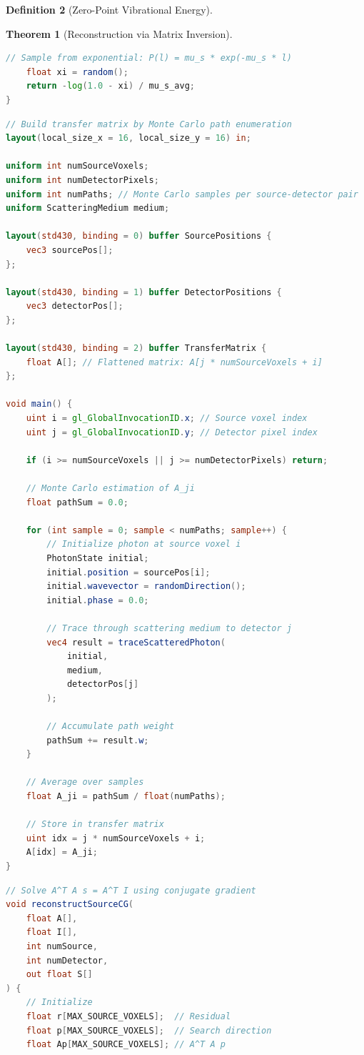 \documentclass[11pt,a4paper]{article}
\newtheorem{theorem}{Theorem}[section]
\theoremstyle{definition}
\newtheorem{definition}[theorem]{Definition}
\theoremstyle{remark}
\begin{document}
\begin{definition}[Zero-Point Vibrational Energy]
\begin{theorem}[Reconstruction via Matrix Inversion]
\begin{lstlisting}[language=GLSL,caption={Discrete Path Enumeration Through Scattering}]
    // Sample from exponential: P(l) = mu_s * exp(-mu_s * l)
    float xi = random();
    return -log(1.0 - xi) / mu_s_avg;
}
\end{lstlisting}

\begin{lstlisting}[language=GLSL,caption={Transfer Matrix Construction}]
// Build transfer matrix by Monte Carlo path enumeration
layout(local_size_x = 16, local_size_y = 16) in;

uniform int numSourceVoxels;
uniform int numDetectorPixels;
uniform int numPaths; // Monte Carlo samples per source-detector pair
uniform ScatteringMedium medium;

layout(std430, binding = 0) buffer SourcePositions {
    vec3 sourcePos[];
};

layout(std430, binding = 1) buffer DetectorPositions {
    vec3 detectorPos[];
};

layout(std430, binding = 2) buffer TransferMatrix {
    float A[]; // Flattened matrix: A[j * numSourceVoxels + i]
};

void main() {
    uint i = gl_GlobalInvocationID.x; // Source voxel index
    uint j = gl_GlobalInvocationID.y; // Detector pixel index
    
    if (i >= numSourceVoxels || j >= numDetectorPixels) return;
    
    // Monte Carlo estimation of A_ji
    float pathSum = 0.0;
    
    for (int sample = 0; sample < numPaths; sample++) {
        // Initialize photon at source voxel i
        PhotonState initial;
        initial.position = sourcePos[i];
        initial.wavevector = randomDirection();
        initial.phase = 0.0;
        
        // Trace through scattering medium to detector j
        vec4 result = traceScatteredPhoton(
            initial,
            medium,
            detectorPos[j]
        );
        
        // Accumulate path weight
        pathSum += result.w;
    }
    
    // Average over samples
    float A_ji = pathSum / float(numPaths);
    
    // Store in transfer matrix
    uint idx = j * numSourceVoxels + i;
    A[idx] = A_ji;
}
\end{lstlisting}

\begin{lstlisting}[language=GLSL,caption={Image Reconstruction via Conjugate Gradient}]
// Solve A^T A s = A^T I using conjugate gradient
void reconstructSourceCG(
    float A[],
    float I[],
    int numSource,
    int numDetector,
    out float S[]
) {
    // Initialize
    float r[MAX_SOURCE_VOXELS];  // Residual
    float p[MAX_SOURCE_VOXELS];  // Search direction
    float Ap[MAX_SOURCE_VOXELS]; // A^T A p
    

\end{lstlisting}
\end{theorem}
\end{definition}
\end{document}
